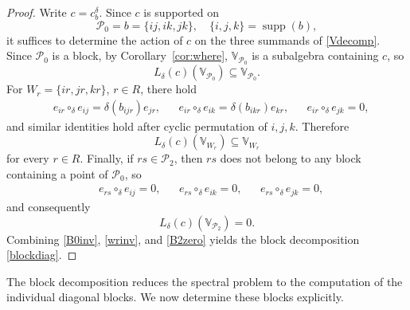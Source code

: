 \documentclass[10pt,a4paper]{amsart}
\numberwithin{equation}{section}
\def\valg{\mathbb{V}}
\DeclareMathOperator{\supp}{supp}
\begin{document}
\begin{proof}
Write $c=c_b^\delta.$ Since $c$ is supported on
$$
\mathcal{P}_0=b=\{ij,ik,jk\},\quad \{i,j,k\}=\supp(b),
$$
it suffices to determine the action of $c$ on the three summands of \eqref{Vdecomp}.
Since $\mathcal{P}_0$ is a block, by Corollary~\ref{cor:where}, $\valg_{\mathcal{P}_0}$ is a subalgebra containing $c$, so
\begin{equation}\label{B0inv}
L_\delta(c)(\valg_{\mathcal{P}_0})
\subseteq
\valg_{\mathcal{P}_0}.
\end{equation}
For $W_r=\{ir,jr,kr\}$, $r\in R$, there hold
\begin{align}\label{wr3}
&e_{ir}\circ_\delta e_{ij}=\delta(b_{ijr}) e_{jr},&
&e_{ir}\circ_\delta e_{ik}=\delta(b_{ikr}) e_{kr},&
&e_{ir}\circ_\delta e_{jk}=0,
\end{align}
and similar identities hold after cyclic permutation of $i,j,k$. Therefore
\begin{equation}\label{wrinv}
L_\delta(c)(\valg_{W_r})
\subseteq
\valg_{W_r}
\end{equation}
for every $r\in R$. Finally, if $rs\in\mathcal{P}_2$, then $rs$ does not belong to any block containing a point of $\mathcal{P}_0$, so
\begin{align}\label{B2a}
&e_{rs}\circ_\delta e_{ij}=0,
&&
e_{rs}\circ_\delta e_{ik}=0,
&&
e_{rs}\circ_\delta e_{jk}=0,
\end{align}
and consequently
\begin{equation}\label{B2zero}
L_\delta(c)(\valg_{\mathcal{P}_2})=0.
\end{equation}
Combining \eqref{B0inv}, \eqref{wrinv}, and \eqref{B2zero} yields the block decomposition \eqref{blockdiag}.
\end{proof}

The block decomposition reduces the spectral problem to the computation of the individual diagonal blocks. We now determine these blocks explicitly.
\end{document}
